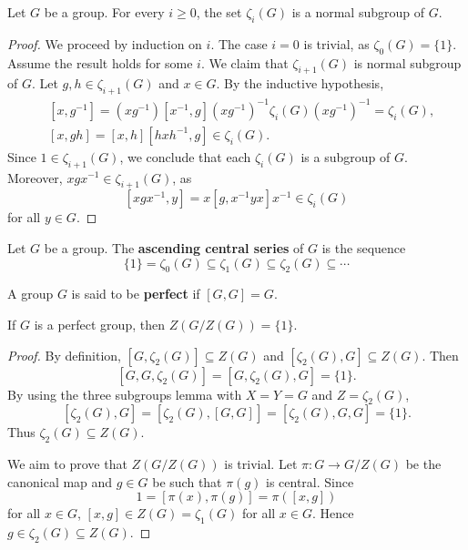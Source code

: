 \begin{lemma}
\label{lem:central_ascendente}
Let $G$ be a group. For every $i\geq0$, the set $\zeta_i(G)$ 
is a normal subgroup of $G$. 
\end{lemma}

\begin{proof}
We proceed by induction on $i$. The case $i=0$ is trivial, as 
$\zeta_0(G)=\{1\}$. Assume the result holds for some $i$.
We claim that $\zeta_{i+1}(G)$ is normal subgroup of $G$. 
Let $g,h\in \zeta_{i+1}(G)$ and $x\in G$. By the inductive hypothesis, 
\begin{align*}
	&[x,g^{-1}]=(xg^{-1})[x^{-1},g](xg^{-1})^{-1}\zeta_i(G)(xg^{-1})^{-1}=\zeta_i(G),\\
	&[x,gh]=[x,h][hxh^{-1},g]\in \zeta_{i}(G).
\end{align*}
Since $1\in\zeta_{i+1}(G)$, we conclude that each $\zeta_i(G)$ is a subgroup of $G$. 
Moreover, $xgx^{-1}\in\zeta_{i+1}(G)$, as  
	\[
	[xgx^{-1},y]=x[g,x^{-1}yx]x^{-1}\in\zeta_{i}(G)
	\]
for all $y\in G$.
\end{proof}

\begin{definition}
Let $G$ be a group. The \textbf{ascending central series} of $G$ 
is the sequence 
\[
\{1\}=\zeta_0(G)\subseteq\zeta_1(G)\subseteq\zeta_2(G)\subseteq\cdots
\]
\end{definition}

\begin{definition}
A group $G$ is said to be \textbf{perfect} if $[G,G]=G$.
\end{definition}

\begin{theorem}[Gr\"un]
\label{thm:Grun}
If $G$ is a perfect group, then $Z(G/Z(G))=\{1\}$. 
\end{theorem}

\begin{proof}
    By definition, $[G,\zeta_2(G)]\subseteq Z(G)$ and 
    $[\zeta_2(G),G]\subseteq Z(G)$. Then 
    \[
    [G,G,\zeta_2(G)]=[G,\zeta_2(G),G]=\{1\}.
    \]
    By using the three subgroups lemma with $X=Y=G$ and $Z=\zeta_2(G)$, 
    \[
    [\zeta_2(G),G]=[\zeta_2(G),[G,G]]=[\zeta_2(G),G,G]=\{1\}.
    \]
    Thus $\zeta_2(G)\subseteq Z(G)$. 
    
    We aim to prove that $Z(G/Z(G))$ is trivial. Let $\pi\colon G\to G/Z(G)$ be the canonical map and 
    $g\in G$ be such that $\pi(g)$ is central. Since 
    \[
    1=[\pi(x),\pi(g)]=\pi([x,g])
    \]
    for all $x\in G$, $[x,g]\in Z(G)=\zeta_1(G)$ for all $x\in G$. Hence 
    $g\in\zeta_2(G)\subseteq Z(G)$. 
\end{proof}

